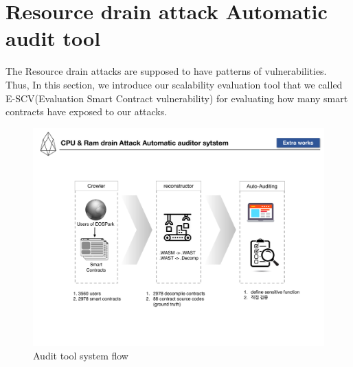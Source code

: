 \chapter{Resource drain attack Automatic audit tool}


The Resource drain attacks are supposed to have patterns of vulnerabilities. Thus, In this section, we introduce our scalability evaluation tool that we called E-SCV(Evaluation Smart Contract vulnerability) for evaluating how many smart contracts have exposed to our attacks.   
\begin{figure}[!h] %
  \centering
  \includegraphics[width=\linewidth]{figures/crawler.pdf}
  \caption{Audit tool system flow}

\end{figure} 


